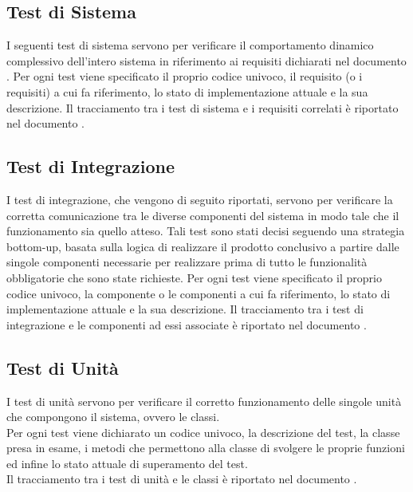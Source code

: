 \documentclass[a4paper, titlepage]{article}
\begin{document}


\newpage
\subsection{Test di Sistema}
I seguenti test di sistema servono per verificare il comportamento dinamico complessivo dell'intero sistema in riferimento ai requisiti dichiarati nel documento .
\newline Per ogni test viene specificato il proprio codice univoco, il requisito (o i requisiti) a cui fa riferimento, lo stato di implementazione attuale e la sua descrizione.
\newline Il tracciamento tra i test di sistema e i requisiti correlati è riportato nel documento .



\newpage
\subsection{Test di Integrazione}
I test di integrazione, che vengono di seguito riportati, servono per verificare la corretta comunicazione tra le diverse componenti del sistema  in modo tale che il funzionamento sia quello atteso.
\newline Tali test sono stati decisi seguendo una strategia bottom-up, basata sulla logica di realizzare il prodotto conclusivo a partire dalle singole componenti necessarie per realizzare  prima di tutto le funzionalità obbligatorie che sono state richieste.
\newline Per ogni test viene specificato il proprio codice univoco, la componente o le componenti a cui fa riferimento, lo stato di implementazione attuale e la sua descrizione. 
\newline Il tracciamento tra i test di integrazione e le componenti ad essi associate è riportato nel documento .



\subsection{Test di Unità}
I test di unità servono per verificare il corretto funzionamento delle singole unità che compongono il sistema, ovvero le classi. 
\\ Per ogni test viene dichiarato un codice univoco, la descrizione del test, la classe presa in esame, i metodi che permettono alla classe di svolgere le proprie funzioni ed infine lo stato attuale di superamento del test.
\\ Il tracciamento tra i test di unità e le classi è riportato nel documento .
\end{document}
